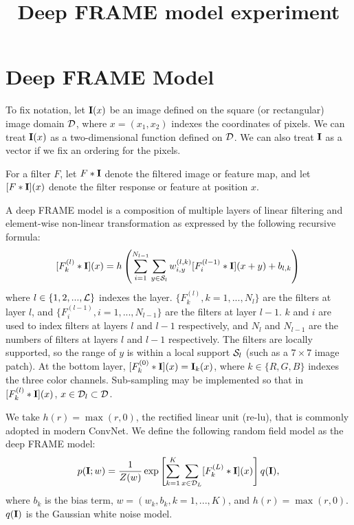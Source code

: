 \documentclass[11pt]{article}
\def\I{{\bf I}}
\def\D{{\cal D}}
\def\S{{\cal S}}
\begin{document}
\title{Deep FRAME model experiment}
	
\section{Deep FRAME Model}
To fix notation, let $\I(x)$ be an image defined on the square (or rectangular) image domain $\D$, where $x = (x_1, x_2)$ indexes the coordinates of pixels. We can treat $\I(x)$ as a two-dimensional function defined on $\D$. We can also treat $\I$ as a vector if we fix an ordering for the pixels. 

For a filter $F$, let $F*\I$ denote the filtered image or feature map, and let $[F*\I](x)$ denote the filter response or feature at position $x$. 

A deep FRAME model is a composition of multiple layers of linear filtering and element-wise non-linear transformation as expressed by the following recursive formula: 
\begin{equation}
	[F^{(l)}_{k}  *\I](x)  =   h\left(\sum_{i=1}^{N_{l-1}}  \sum_{y \in \S_{l}} w^{(l, k)}_{i, y}   [F^{(l-1)}_{i}*\I](x+y) + b_{l, k}\right) \\
	\label{eq:ConvNet}
\end{equation}
where $l \in \{1, 2, ..., {\cal L}\}$ indexes the layer.  $\{F^{(l)}_k, k = 1, ..., N_l\}$ are the filters at layer $l$, and $\{F^{(l-1)}_i, i = 1, ..., N_{l-1}\}$ are the filters at layer $l-1$.  $k$ and $i$ are used to index filters at layers $l$ and $l-1$ respectively, and $N_l$ and $N_{l-1}$ are the numbers of filters at layers $l$ and $l-1$ respectively. The filters are locally supported, so the range of $y$  is within a local support $\S_{l}$  (such as a $7 \times 7$ image patch). At the bottom layer, $[F^{(0)}_k*\I](x) = \I_k(x)$, where $k \in \{R, G, B\}$ indexes the three color channels. Sub-sampling may be implemented so that in  $[F^{(l)}_{k}  *\I](x)$, $x \in \D_l \subset \D$. 

We take $h(r) = \max(r, 0)$, the rectified linear unit (re-lu), that is commonly adopted in modern ConvNet. We define the following random field model as the deep FRAME model:
\begin{equation}
p(\I; w) = \frac{1}{Z(w)} \exp \left[\sum_{k=1}^{K} \sum_{x \in {\cal D}_L} [F_k^{(L)}*\I](x)\right] q(\I), 
\label{eq:ConvNet-FRAME}
\end{equation}
where $b_k$ is the bias term, $w = (w_k, b_k, k = 1, ..., K)$, and $h(r) = \max(r, 0)$. $q(\I)$ is the Gaussian white noise model.
\end{document}
